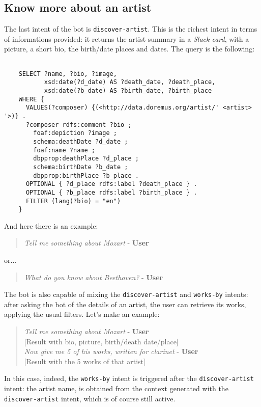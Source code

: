 	\subsection{Know more about an artist}
	The last intent of the bot is \texttt{discover-artist}. This is the richest intent in terms of informations provided: it returns the artist summary in a \textit{Slack card}, with a picture, a short bio, the birth/date places and dates.
	The query is the following:
	\begin{lstlisting}
	
	SELECT ?name, ?bio, ?image,
	       xsd:date(?d_date) AS ?death_date, ?death_place,
	       xsd:date(?b_date) AS ?birth_date, ?birth_place
	WHERE {
	  VALUES(?composer) {(<http://data.doremus.org/artist/' <artist> '>)} .
	  ?composer rdfs:comment ?bio ;
	    foaf:depiction ?image ;
	    schema:deathDate ?d_date ;
	    foaf:name ?name ;
	    dbpprop:deathPlace ?d_place ;
	    schema:birthDate ?b_date ;
	    dbpprop:birthPlace ?b_place .
	  OPTIONAL { ?d_place rdfs:label ?death_place } .
	  OPTIONAL { ?b_place rdfs:label ?birth_place } .
	  FILTER (lang(?bio) = "en")
	}
	\end{lstlisting}
	And here there is an example:
	\begin{verse}
		\textit{Tell me something about Mozart} - \textbf{User}\\
	\end{verse}
	or...
	\begin{verse}
		\textit{What do you know about Beethoven?} - \textbf{User}\\
	\end{verse}
	The bot is also capable of mixing the \texttt{discover-artist} and \texttt{works-by} intents:
	after asking the bot of the details of an artist, the user can retrieve its works, applying the usual filters. Let's make an example:
	
	\begin{verse}
		\textit{Tell me something about Mozart} - \textbf{User}\\
		{[Result with bio, picture, birth/death date/place]}\\
		\textit{Now give me 5 of his works, written for clarinet} - \textbf{User}\\
		{[Result with the 5 works of that artist]}\\
	\end{verse}
	In this case, indeed, the \texttt{works-by} intent is triggered after the \texttt{discover-artist} intent: the artist name, is obtained from the context generated with the \texttt{discover-artist} intent, which is of course still active.

